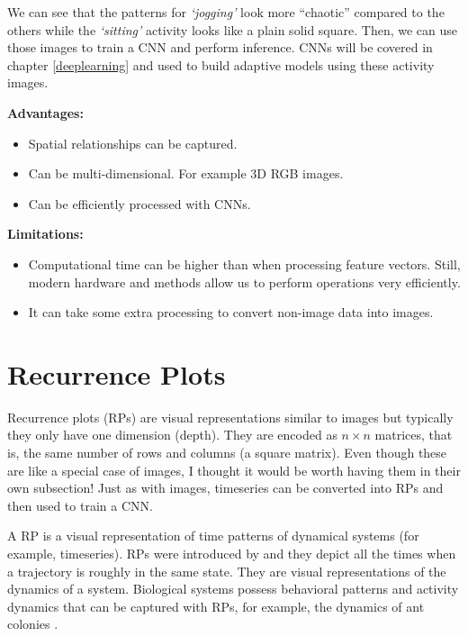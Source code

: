 \documentclass[
  11pt,
]{krantz}
\providecommand{\tightlist}{%
  \setlength{\itemsep}{0pt}\setlength{\parskip}{0pt}}
\begin{document}
We can see that the patterns for \emph{`jogging'} look more ``chaotic'' compared to the others while the \emph{`sitting'} activity looks like a plain solid square. Then, we can use those images to train a CNN and perform inference. CNNs will be covered in chapter \ref{deeplearning} and used to build adaptive models using these activity images.

\textbf{Advantages:}

\begin{itemize}
\tightlist
\item
  Spatial relationships can be captured.
\item
  Can be multi-dimensional. For example \(3\)D RGB images.
\item
  Can be efficiently processed with CNNs.
\end{itemize}

\textbf{Limitations:}

\begin{itemize}
\tightlist
\item
  Computational time can be higher than when processing feature vectors. Still, modern hardware and methods allow us to perform operations very efficiently.
\item
  It can take some extra processing to convert non-image data into images.
\end{itemize}

\hypertarget{recurrence-plots}{%
\section{Recurrence Plots}\label{recurrence-plots}}

Recurrence plots (RPs) are visual representations similar to images but typically they only have one dimension (depth). They are encoded as \(n \times n\) matrices, that is, the same number of rows and columns (a square matrix). Even though these are like a special case of images, I thought it would be worth having them in their own subsection! Just as with images, timeseries can be converted into RPs and then used to train a CNN.

A RP is a visual representation of time patterns of dynamical systems (for example, timeseries). RPs were introduced by \citet{eckmann1987recurrence} and they depict all the times when a trajectory is roughly in the same state. They are visual representations of the dynamics of a system. Biological systems possess behavioral patterns and activity dynamics that can be captured with RPs, for example, the dynamics of ant colonies \citep{Neves2017}.
\end{document}
